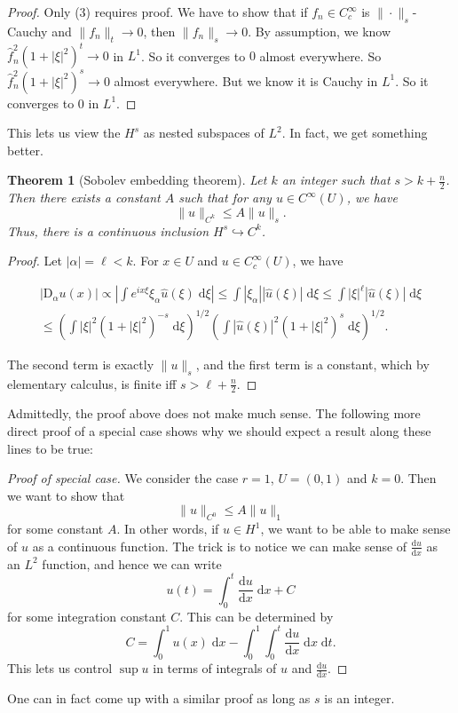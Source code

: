 \documentclass{shortart}
\newtheorem*{thm}{Theorem}
\theoremstyle{definition}
\newcommand\der{\mathrm{d}}
\newcommand\D{\mathrm{D}}
\begin{document}
\begin{proof}
  Only (3) requires proof. We have to show that if $f_n \in C_c^\infty$ is $\|\cdot\|_s$-Cauchy and $\|f_n\|_t \to 0$, then $\|f_n\|_s \to 0$. By assumption, we know $\hat{f}_n^2(1 + |\xi|^2)^t \to 0$ in $L^1$. So it converges to $0$ almost everywhere. So $\hat{f}_n^2 (1 + |\xi|^2)^s \to 0$ almost everywhere. But we know it is Cauchy in $L^1$. So it converges to $0$ in $L^1$.
\end{proof}

This lets us view the $H^s$ as nested subspaces of $L^2$. In fact, we get something better.
\begin{thm}[Sobolev embedding theorem]
  Let $k$ an integer such that $s > k + \frac{n}{2}$. Then there exists a constant $A$ such that for any $u \in C^{\infty}(U)$, we have
  \[
    \|u\|_{C^k} \leq A \|u\|_s.
  \]
  Thus, there is a continuous inclusion $H^s \hookrightarrow C^k$.
\end{thm}
\begin{proof}
  Let $|\alpha| = \ell < k$. For $x \in U$ and $u \in C^\infty_c(U)$, we have
  \begin{useimager}
    \begin{multline*}
      |\D_\alpha u(x)| \propto \left| \int e^{ix\xi} \xi_\alpha \hat{u}(\xi) \;\der \xi\right| \leq \int |\xi_\alpha| |\hat{u}(\xi)| \;\der \xi \leq \int |\xi|^\ell |\hat{u}(\xi)|\;\der \xi \\
      \leq \left(\int |\xi|^2 (1 + |\xi|^2)^{-s}\;\der \xi\right)^{1/2}\left(\int |\hat{u}(\xi)|^2 (1 + |\xi|^2)^s\;\der \xi\right)^{1/2}.
    \end{multline*}
  \end{useimager}
  The second term is exactly $\|u\|_s$, and the first term is a constant, which by elementary calculus, is finite iff $s > \ell + \frac{n}{2}$.
\end{proof}

Admittedly, the proof above does not make much sense. The following more direct proof of a special case shows why we should expect a result along these lines to be true:
\begin{proof}[Proof of special case]
  We consider the case $r = 1$, $U = (0, 1)$ and $k = 0$. Then we want to show that
  \[
    \|u\|_{C^0} \leq A \|u\|_1
  \]
  for some constant $A$. In other words, if $u \in H^1$, we want to be able to make sense of $u$ as a continuous function. The trick is to notice we can make sense of $\frac{\der u}{\der x}$ as an $L^2$ function, and hence we can write
  \[
    u(t) = \int_0^t \frac{\der u}{\der x}\;\der x + C
  \]
  for some integration constant $C$. This can be determined by
  \[
    C = \int_0^1 u(x)\;\der x - \int_0^1 \int_0^t \frac{\der u}{\der x}\;\der x\;\der t.
  \]
  This lets us control $\sup u$ in terms of integrals of $u$ and $\frac{\der u}{\der x}$.
\end{proof}
One can in fact come up with a similar proof as long as $s$ is an integer.
\end{document}
